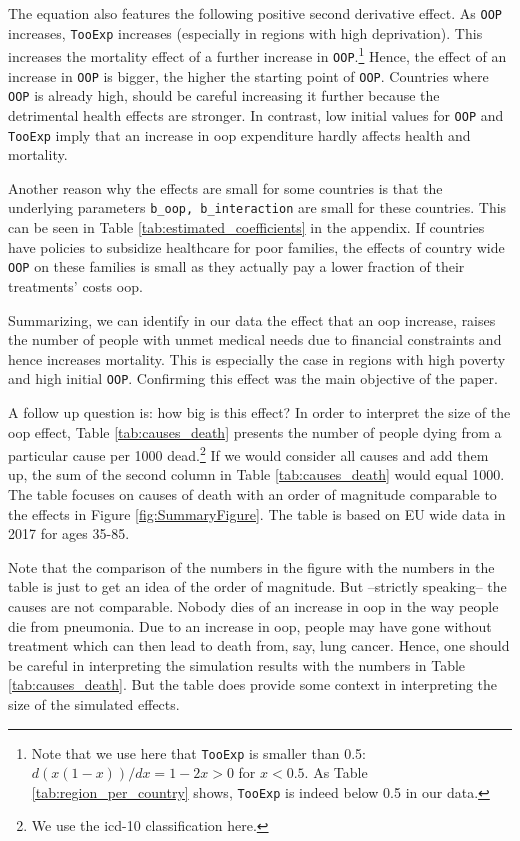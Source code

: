 \documentclass[a4paper,12pt]{article}
\begin{document}
The equation also features the following positive second derivative effect. As \texttt{OOP} increases, \texttt{TooExp} increases (especially in regions with high deprivation). This increases the mortality effect of a further increase in \texttt{OOP}.\footnote{Note that we use here that \texttt{TooExp} is smaller than 0.5: \(d(x(1-x))/dx = 1-2x >0\) for \(x<0.5\). As Table \ref{tab:region_per_country} shows, \texttt{TooExp} is indeed below 0.5 in our data.} Hence, the effect of an increase in \texttt{OOP} is bigger, the higher the starting point of \texttt{OOP}. Countries where \texttt{OOP} is already high, should be careful increasing it further because the detrimental health effects are stronger. In contrast, low initial values for \texttt{OOP} and \texttt{TooExp} imply that an increase in oop expenditure hardly affects health and mortality.

Another reason why the effects are small for some countries is that the underlying parameters \texttt{b\_oop, b\_interaction} are small for these countries. This can be seen in Table \ref{tab:estimated_coefficients} in the appendix. If countries have policies to subsidize healthcare for poor families, the effects of country wide \texttt{OOP} on these families is small as they actually pay a lower fraction of their treatments' costs oop. 

Summarizing, we can identify in our data the effect that an oop increase, raises the number of people with unmet medical needs due to financial constraints and hence increases mortality. This is especially the case in regions with high poverty and high initial \texttt{OOP}. Confirming this effect was the main objective of the paper.

A follow up question is: how big is this effect? In order to interpret the size of the oop effect, Table \ref{tab:causes_death} presents the number of people dying from a particular cause per 1000 dead.\footnote{We use the icd-10 classification here.} If we would consider all causes and add them up, the sum of the second column in Table \ref{tab:causes_death} would equal 1000. The table focuses on causes of death with an order of magnitude comparable to the effects in Figure \ref{fig:SummaryFigure}. The table is based on EU wide data in 2017 for ages 35-85. 

Note that the comparison of the numbers in the figure with the numbers in the table is just to get an idea of the order of magnitude. But --strictly speaking-- the causes are not comparable. Nobody dies of an increase in oop in the way people die from pneumonia. Due to an increase in oop, people may have gone without treatment which can then lead to death from, say, lung cancer. Hence, one should be careful in interpreting the simulation results with the numbers in Table \ref{tab:causes_death}. But the table does provide some context in interpreting the size of the simulated effects.
\end{document}

